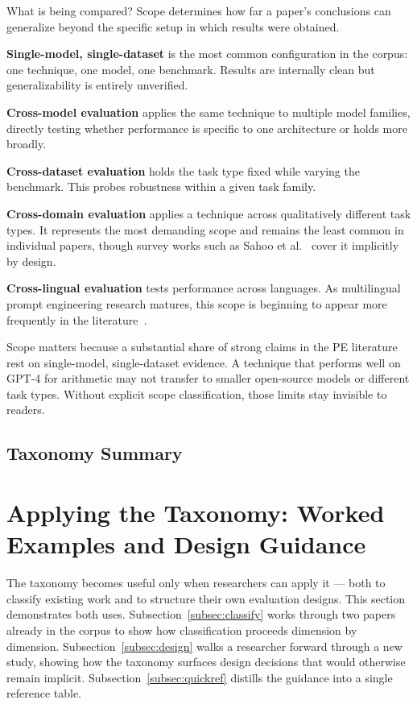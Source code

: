 \documentclass[journal]{IEEEtran}
\begin{document}
What is being compared? Scope determines how far a paper's conclusions
can generalize beyond the specific setup in which results were obtained.

\textbf{Single-model, single-dataset} is the most common configuration in the corpus:
one technique, one model, one benchmark. Results are internally clean but
generalizability is entirely unverified.

\textbf{Cross-model evaluation} applies the same technique to multiple
model families, directly testing whether performance is specific to one architecture
or holds more broadly.

\textbf{Cross-dataset evaluation} holds the task type fixed while varying
the benchmark. This probes robustness within a given task family.

\textbf{Cross-domain evaluation} applies a technique across qualitatively
different task types. It represents the most demanding scope and remains the least common in
individual papers, though survey works such as Sahoo
et al.~\cite{sahoo2024systematic} cover it implicitly by design.

\textbf{Cross-lingual evaluation} tests performance across languages. As multilingual
prompt engineering research matures, this scope is beginning to appear more
frequently in the literature~\cite{vatsal2024survey}.

Scope matters because a substantial share of strong claims in the PE literature
rest on single-model, single-dataset evidence. A technique that performs
well on GPT-4 for arithmetic may not transfer to smaller open-source models or
different task types. Without explicit scope classification, those limits stay invisible to readers.

\subsection{Taxonomy Summary}




\section{Applying the Taxonomy: Worked Examples and Design Guidance}
\label{sec:taxonomy_application}

The taxonomy becomes useful only when researchers can apply it — both
to classify existing work and to structure their own evaluation designs.
This section demonstrates both uses. Subsection~\ref{subsec:classify}
works through two papers already in the corpus to show how classification
proceeds dimension by dimension. Subsection~\ref{subsec:design} walks a
researcher forward through a new study, showing how the taxonomy surfaces
design decisions that would otherwise remain implicit.
Subsection~\ref{subsec:quickref} distills the guidance into a single
reference table.
\end{document}
